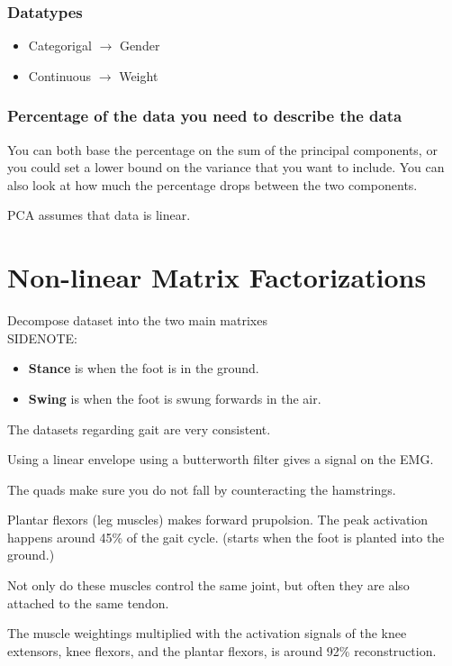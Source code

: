 \documentclass[a4paper]{article}
\begin{document}
\subsubsection{Datatypes}
\begin{itemize}
	\item Categorigal $ \rightarrow $ Gender
\item Continuous $ \rightarrow $ Weight
\end{itemize}


\subsubsection{Percentage of the data you need to describe the data}
You can both base the percentage on the sum of the principal components, or you could set a lower bound on the variance that you want to include. You can also look at how much the percentage drops between the two components.


PCA assumes that data is linear. 

\section{Non-linear Matrix Factorizations}
Decompose dataset into the two main matrixes \\
SIDENOTE:
\begin{itemize}
	\item \textbf{Stance} is when the foot is in the ground.
	\item \textbf{Swing} is when the foot is swung forwards in the air.
\end{itemize}
The datasets regarding gait are very consistent.

Using a linear envelope using a butterworth filter gives a signal on the EMG.

The quads make sure you do not fall by counteracting the hamstrings. 

Plantar flexors  (leg muscles) makes forward prupolsion. The peak activation happens around 45\% of the gait cycle. (starts when the foot is planted into the ground.)

Not only do these muscles control the same joint, but often they are also attached to the same tendon.


The muscle weightings multiplied with the activation signals of the knee extensors, knee flexors, and the plantar flexors, is around 92\% reconstruction.
\end{document}
